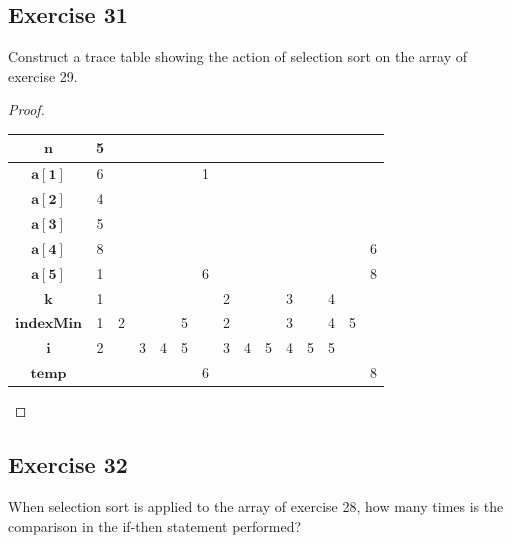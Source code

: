 \documentclass[14pt]{extarticle}
\begin{document}
\subsection{Exercise 31}
Construct a trace table showing the action of selection sort on the array of exercise 29.

\begin{proof}
    \begin{center}
        \begin{tabular}{|c|c|c|c|c|c|c|c|c|c|c|c|c|c|c|}
            \hline
            \(\bm{n}\)        & 5 &   &   &   &   &   &   &   &   &   &   &   &   &   \\
            \hline
            \(\bm{a[1]}\)     & 6 &   &   &   &   & 1 &   &   &   &   &   &   &   &   \\
            \hline
            \(\bm{a[2]}\)     & 4 &   &   &   &   &   &   &   &   &   &   &   &   &   \\
            \hline
            \(\bm{a[3]}\)     & 5 &   &   &   &   &   &   &   &   &   &   &   &   &   \\
            \hline
            \(\bm{a[4]}\)     & 8 &   &   &   &   &   &   &   &   &   &   &   &   & 6 \\
            \hline
            \(\bm{a[5]}\)     & 1 &   &   &   &   & 6 &   &   &   &   &   &   &   & 8 \\
            \hline
            \(\bm{k}\)        & 1 &   &   &   &   &   & 2 &   &   & 3 &   & 4 &   &   \\
            \hline
            \(\bm{indexMin}\) & 1 & 2 &   &   & 5 &   & 2 &   &   & 3 &   & 4 & 5 &   \\
            \hline
            \(\bm{i}\)        & 2 &   & 3 & 4 & 5 &   & 3 & 4 & 5 & 4 & 5 & 5 &   &   \\
            \hline
            \(\bm{temp}\)     &   &   &   &   &   & 6 &   &   &   &   &   &   &   & 8 \\
            \hline
        \end{tabular}
    \end{center}
\end{proof}

\subsection{Exercise 32}
When selection sort is applied to the array of exercise 28, how many times is the comparison in the if-then statement
performed?
\end{document}
